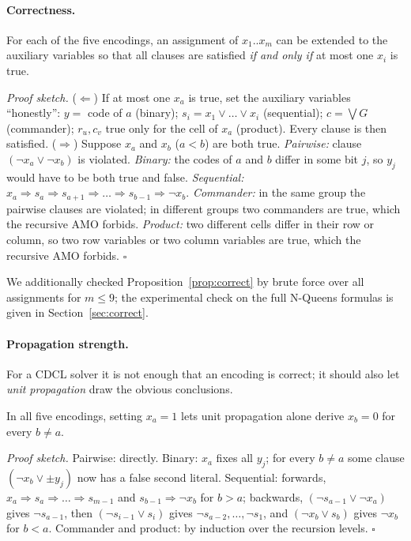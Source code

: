\paragraph{Correctness.}
\begin{proposition}\label{prop:correct}
For each of the five encodings, an assignment of $x_1..x_m$ can be extended to the auxiliary variables so that all clauses are satisfied \emph{if and only if} at most one $x_i$ is true.
\end{proposition}
\noindent\textit{Proof sketch.} ($\Leftarrow$) If at most one $x_a$ is true, set the auxiliary variables ``honestly'': $y=$ code of $a$ (binary); $s_i=x_1\vee\dots\vee x_i$ (sequential); $c=\bigvee G$ (commander); $r_u, c_v$ true only for the cell of $x_a$ (product). Every clause is then satisfied. ($\Rightarrow$) Suppose $x_a$ and $x_b$ ($a<b$) are both true. \emph{Pairwise:} clause $(\neg x_a\vee\neg x_b)$ is violated. \emph{Binary:} the codes of $a$ and $b$ differ in some bit $j$, so $y_j$ would have to be both true and false. \emph{Sequential:} $x_a\Rightarrow s_a\Rightarrow s_{a+1}\Rightarrow\dots\Rightarrow s_{b-1}\Rightarrow\neg x_b$. \emph{Commander:} in the same group the pairwise clauses are violated; in different groups two commanders are true, which the recursive AMO forbids. \emph{Product:} two different cells differ in their row or column, so two row variables or two column variables are true, which the recursive AMO forbids. $\square$

We additionally checked Proposition~\ref{prop:correct} by brute force over all assignments for $m\le9$; the experimental check on the full N-Queens formulas is given in Section~\ref{sec:correct}.

\paragraph{Propagation strength.}
For a CDCL solver it is not enough that an encoding is correct; it should also let \emph{unit propagation} draw the obvious conclusions.
\begin{proposition}\label{prop:up}
In all five encodings, setting $x_a=1$ lets unit propagation alone derive $x_b=0$ for every $b\neq a$.
\end{proposition}
\noindent\textit{Proof sketch.} Pairwise: directly. Binary: $x_a$ fixes all $y_j$; for every $b\neq a$ some clause $(\neg x_b\vee\pm y_j)$ now has a false second literal. Sequential: forwards, $x_a\Rightarrow s_a\Rightarrow\dots\Rightarrow s_{m-1}$ and $s_{b-1}\Rightarrow\neg x_b$ for $b>a$; backwards, $(\neg s_{a-1}\vee\neg x_a)$ gives $\neg s_{a-1}$, then $(\neg s_{i-1}\vee s_i)$ gives $\neg s_{a-2},\dots,\neg s_1$, and $(\neg x_b\vee s_b)$ gives $\neg x_b$ for $b<a$. Commander and product: by induction over the recursion levels. $\square$

